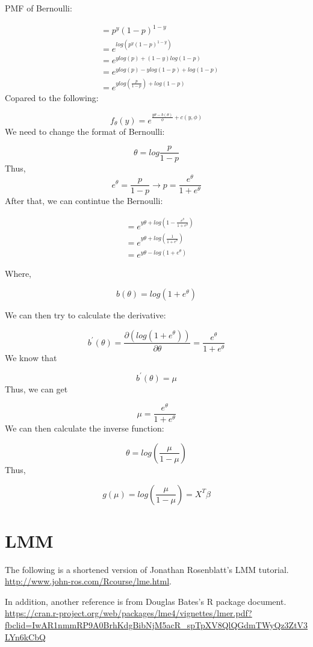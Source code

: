 \documentclass[]{book}
\begin{document}
PMF of Bernoulli:

\[ \begin{aligned} &= p^y(1-p)^{1-y}  \\ &=e^{log(p^y(1-p)^{1-y})} \\ &= e^{ylog(p)+(1-y)log(1-p)}\\ &= e^{ylog(p)-ylog(1-p)+log(1-p)}\\ &=e^{ylog(\frac{p}{1-p})+log(1-p)} \end{aligned} \]
Copared to the following:

\[f_{\theta}(y)=e^{\frac{y\theta-b(\theta)}{\phi}+c(y,\phi)}\] We need
to change the format of Bernoulli:

\[\theta= log \frac{p}{1-p}\] Thus,
\[e^{\theta}=\frac{p}{1-p} \rightarrow p=\frac{e^{\theta}}{1+e^{\theta}} \]
After that, we can contintue the Bernoulli:

\[\begin{aligned} &= e^{y\theta+log(1-\frac{e^{\theta}}{1+e^{\theta}})} \\ &=e^{y\theta+log(\frac{1}{1+e^{\theta}})} \\ &=e^{y\theta-log(1+e^{\theta})} \end{aligned}\]

Where,

\[b(\theta)=log(1+e^{\theta})\]

We can then try to calculate the derivative:

\[b^{'}(\theta)=\frac{\partial (log(1+e^{\theta}))}{\partial \theta}=\frac{e^{\theta}}{1+e^{\theta}}\]
We know that

\[b^{'}(\theta)=\mu\] Thus, we can get

\[\mu=\frac{e^{\theta}}{1+e^{\theta}}\] We can then calculate the
inverse function:

\[\theta=log(\frac{\mu}{1-\mu})\] Thus,

\[g(\mu)=log(\frac{\mu}{1-\mu})=X^T \beta\]

\section{LMM}\label{lmm}

The following is a shortened version of Jonathan Rosenblatt's LMM
tutorial. \url{http://www.john-ros.com/Rcourse/lme.html}.

In addition, another reference is from Douglas Bates's R package
document.
\url{https://cran.r-project.org/web/packages/lme4/vignettes/lmer.pdf?fbclid=IwAR1nmmRP9A0BrhKdgBibNjM5acR_spTpXV8QlQGdmTWyQz3ZtV3LYn6kCbQ}
\end{document}
